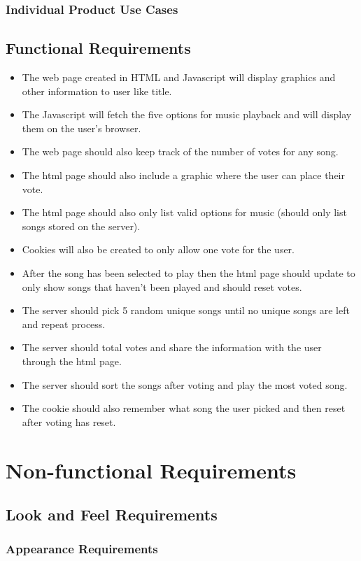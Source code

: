 \documentclass[12pt, titlepage]{article}
\begin{document}
\subsubsection{Individual Product Use Cases}

\subsection{Functional Requirements}
\begin{itemize}
\item The web page created in HTML and Javascript will display graphics and other information to user like title.
\item The Javascript will fetch the five options for music playback and will display them on the user's browser.
\item The web page should also keep track of the number of votes for any song.
\item The html page should also include a graphic where the user can place their vote.
\item The html page should also only list valid options for music (should only list songs stored on the server).
\item Cookies will also be created to only allow one vote for the user.
\item After the song has been selected to play then the html page should update to only show songs that haven't been played and should reset votes.
\item The server should pick 5 random unique songs until no unique songs are left and repeat process.
\item The server should total votes and share the information with the user through the html page.
\item The server should sort the songs after voting and play the most voted song.
\item The cookie should also remember what song the user picked and then reset after voting has reset.
\end{itemize}

\section{Non-functional Requirements}

\subsection{Look and Feel Requirements}
\subsubsection{Appearance Requirements}
\end{document}
